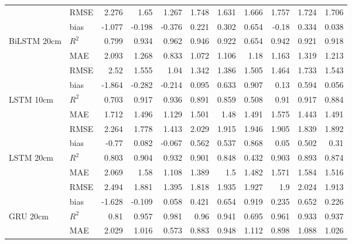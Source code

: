 \begin{tabular}{llrrrrrrrrr}
                                     & RMSE  &  2.276 &  1.65  &  1.267 & 1.748 & 1.631 &  1.666 &  1.757 & 1.724 &     1.706 \\
                                     & bias  & -1.077 & -0.198 & -0.376 & 0.221 & 0.302 &  0.654 & -0.18  & 0.334 &     0.038 \\
 BiLSTM 20cm                         & $R^2$ &  0.799 &  0.934 &  0.962 & 0.946 & 0.922 &  0.654 &  0.942 & 0.921 &     0.918 \\
                                     & MAE   &  2.093 &  1.268 &  0.833 & 1.072 & 1.106 &  1.18  &  1.163 & 1.319 &     1.213 \\
                                     & RMSE  &  2.52  &  1.555 &  1.04  & 1.342 & 1.386 &  1.505 &  1.464 & 1.733 &     1.543 \\
                                     & bias  & -1.864 & -0.282 & -0.214 & 0.095 & 0.633 &  0.907 &  0.13  & 0.594 &     0.056 \\
 LSTM 10cm                           & $R^2$ &  0.703 &  0.917 &  0.936 & 0.891 & 0.859 &  0.508 &  0.91  & 0.917 &     0.884 \\
                                     & MAE   &  1.712 &  1.496 &  1.129 & 1.501 & 1.48  &  1.491 &  1.575 & 1.443 &     1.491 \\
                                     & RMSE  &  2.264 &  1.778 &  1.413 & 2.029 & 1.915 &  1.946 &  1.905 & 1.839 &     1.892 \\
                                     & bias  & -0.77  &  0.082 & -0.067 & 0.562 & 0.537 &  0.868 &  0.05  & 0.502 &     0.31  \\
 LSTM 20cm                           & $R^2$ &  0.803 &  0.904 &  0.932 & 0.901 & 0.848 &  0.432 &  0.903 & 0.893 &     0.874 \\
                                     & MAE   &  2.069 &  1.58  &  1.108 & 1.389 & 1.5   &  1.482 &  1.571 & 1.584 &     1.516 \\
                                     & RMSE  &  2.494 &  1.881 &  1.395 & 1.818 & 1.935 &  1.927 &  1.9   & 2.024 &     1.913 \\
                                     & bias  & -1.628 & -0.109 &  0.058 & 0.421 & 0.654 &  0.919 &  0.235 & 0.652 &     0.226 \\
 GRU 20cm                            & $R^2$ &  0.81  &  0.957 &  0.981 & 0.96  & 0.941 &  0.695 &  0.961 & 0.933 &     0.937 \\
                                     & MAE   &  2.029 &  1.016 &  0.573 & 0.883 & 0.948 &  1.112 &  0.898 & 1.088 &     1.026 \\

\end{tabular}
